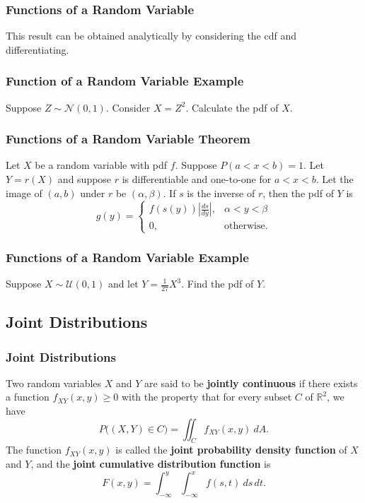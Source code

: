 \documentclass{beamer}
\begin{document}
\begin{frame}
\frametitle{Functions of a Random Variable}
This result can be obtained analytically by considering the cdf and differentiating. 
\end{frame}

\begin{frame}[t]
\frametitle{Function of a Random Variable Example}
\begin{Example}
Suppose $Z\sim{\mathcal{N}(0, 1)}$. Consider $X = Z^2$. Calculate the pdf of $X$.
\end{Example}

\end{frame}

\begin{frame}
\frametitle{Functions of a Random Variable Theorem}

\begin{Theorem}
Let $X$ be a random variable with pdf $f$. Suppose $P(a < x < b) = 1$. Let $Y = r(X)$ and suppose $r$ is differentiable and one-to-one for $a < x < b$. Let the image of $(a, b)$ under $r$ be $(\alpha, \beta)$. If $s$ is the inverse of $r$, then the pdf of $Y$ is
$$
g(y) = \begin{cases} f\left(s(y)\right)\left|\frac{ds}{dy}\right|,	&	\alpha < y <\beta\\ 0,	&	\text{otherwise.}\end{cases}
$$
\end{Theorem}

\end{frame}

\begin{frame}[t]
\frametitle{Functions of a Random Variable Example}
\begin{Example}
Suppose $X\sim{\mathcal{U}(0, 1)}$ and let $Y = \frac{1}{27}X^3$. Find the pdf of $Y$.
\end{Example}

\end{frame}


\subsection{Joint Distributions} 

\begin{frame}

\frametitle{Joint Distributions}
\begin{Definition}
Two random variables $X$ and $Y$ are said to be {\bf jointly continuous} if there exists a function $f_{XY}(x, y) \geq 0$ with the property that for every subset $C$ of $\mathbb{R}^2$, we have
$$
P\Big((X, Y)\in C\Big) = \iint_C f_{XY}(x, y)\ dA.
$$
The function $f_{XY}(x, y)$ is called the {\bf joint probability density function} of $X$ and $Y$, and the {\bf joint cumulative distribution function} is
$$
F(x, y) = \int_{-\infty}^y\int_{-\infty}^x f(s, t)\ ds\,dt.
$$
\end{Definition}

\end{frame}
\end{document}
